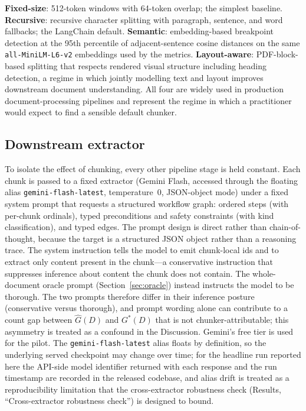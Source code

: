 \documentclass[make,article,submit,oneauthor,pdftex]{Definitions/mdpi}
\begin{document}
\textbf{Fixed-size}: 512-token windows with 64-token overlap; the
simplest baseline. \textbf{Recursive}: recursive character splitting
with paragraph, sentence, and word fallbacks; the LangChain default.
\textbf{Semantic}: embedding-based breakpoint detection at the 95th
percentile of adjacent-sentence cosine distances on the same
\texttt{all-MiniLM-L6-v2} embeddings used by the metrics.
\textbf{Layout-aware}: PDF-block-based splitting that respects rendered
visual structure including heading detection, a regime in which jointly
modelling text and layout improves downstream document
understanding\cite{xu2020layoutlm,blecher2023nougat}. All four are
widely used in production document-processing pipelines and represent the regime
in which a practitioner would expect to find a sensible default
chunker.

\subsection{Downstream extractor}

To isolate the effect of chunking, every other pipeline stage is held
constant. Each chunk is passed to a fixed extractor (Gemini Flash,
accessed through the floating alias \texttt{gemini-flash-latest},
temperature~0, JSON-object mode) under a fixed system prompt that
requests a structured workflow graph: ordered steps (with per-chunk
ordinals), typed preconditions and safety constraints (with kind
classification), and typed edges. The prompt design is direct rather
than chain-of-thought, because the target is a structured JSON object
rather than a reasoning trace\cite{wei2022cot}. The system instruction
tells the model to emit chunk-local ids and to extract only content
present in the chunk---a conservative instruction that suppresses
inference about content the chunk does not contain. The whole-document
oracle prompt (Section~\ref{sec:oracle}) instead instructs the
model to be thorough. The two prompts therefore differ in their
inference posture (conservative versus thorough), and prompt wording
alone can contribute to a count gap between $\hat{G}(D)$ and
$G^{*}(D)$ that is not chunker-attributable; this asymmetry is treated
as a confound in the Discussion. Gemini's free tier is used for the
pilot. The
\texttt{gemini-flash-latest} alias floats by definition, so the
underlying served checkpoint may change over time; for the headline
run reported here the API-side model identifier returned with each
response and the run timestamp are recorded in the released codebase,
and alias drift is treated as a reproducibility limitation that the
cross-extractor robustness check (Results, ``Cross-extractor
robustness check'') is designed to bound.
\end{document}
